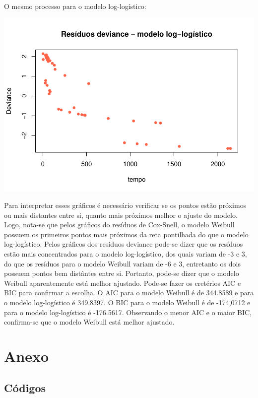 \documentclass[]{article}
\begin{document}
O mesmo processo para o modelo log-logístico:

\begin{center}\includegraphics[width=0.8\linewidth]{Lista_3_files/figure-latex/unnamed-chunk-22-1} \end{center}

Para interpretar esses gráficos é necessário verificar se os pontos
estão próximos ou mais distantes entre si, quanto mais próximos melhor o
ajuste do modelo. Logo, nota-se que pelos gráficos do resíduos de
Cox-Snell, o modelo Weibull possuem os primeiros pontos mais próximos da
reta pontilhada do que o modelo log-logístico. Pelos gráficos dos
resíduos deviance pode-se dizer que os resíduos estão mais concentrados
para o modelo log-logístico, dos quais variam de -3 e 3, do que os
resíduos para o modelo Weibull variam de -6 e 3, entretanto os dois
possuem pontos bem distântes entre si. Portanto, pode-se dizer que o
modelo Weibull aparentemente está melhor ajustado. Pode-se fazer os
cretérios AIC e BIC para confirmar a escolha. O AIC para o modelo
Weibull é de 344.8589 e para o modelo log-logístico é 349.8397. O BIC
para o modelo Weibull é de -174,0712 e para o modelo log-logístico é
-176.5617. Observando o menor AIC e o maior BIC, confirma-se que o
modelo Weibull está melhor ajustado.

\section{Anexo}\label{anexo}

\subsection{Códigos}\label{codigos}
\end{document}
